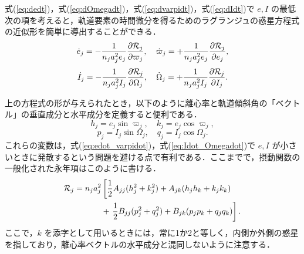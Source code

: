 \documentclass[11pt,a4paper,oneside,onecolumn]{jreport}
\begin{document}
式(\ref{eq:dedt})，式(\ref{eq:dOmegadt})，式(\ref{eq:dvarpidt})，式(\ref{eq:dIdt})で $e, I$ の最低次の項を考えると，軌道要素の時間微分を得るためのラグランジュの惑星方程式の近似形を簡単に導出することができる．
\begin{equation}
\dot{e}_j = - \frac{1}{n_j a_j^2 e_j} \frac{\partial {\cal R}_j}{\partial \varpi_j}, \quad \dot{\varpi}_j = + \frac{1}{n_j a_j^2 e_j} \frac{\partial {\cal R}_j}{\partial e_j}, \label{eq:edot_varpidot}
\end{equation}
\begin{equation}
\dot{I}_j = - \frac{1}{n_j a_j^2 I_j} \frac{\partial {\cal R}_j}{\partial \Omega_j}, \quad \dot{\Omega}_j = + \frac{1}{n_j a_j^2 I_j} \frac{\partial {\cal R}_j}{\partial I_j}. \label{eq:Idot_Omegadot}
\end{equation}

上の方程式の形が与えられたとき，以下のように離心率と軌道傾斜角の「ベクトル」の垂直成分と水平成分を定義すると便利である．
\begin{equation}
h_j = e_j \sin \varpi_j, \quad k_j = e_j \cos \varpi_j,
\end{equation}
\begin{equation}
p_j = I_j \sin \Omega_j, \quad q_j = I_j \cos \Omega_j.
\end{equation}
これらの変数は，式(\ref{eq:edot_varpidot})，式(\ref{eq:Idot_Omegadot})で $e, I$ が小さいときに発散するという問題を避ける点で有利である．ここまでで，摂動関数の一般化された永年項はこのように書ける．
\begin{equation}
\begin{split}
{\cal R}_j = n_j a_j^2 & \left[ \frac{1}{2} A_{jj} (h_j^2 + k_j^2) + A_{jk} (h_j h_k + k_j k_k) \right. \\
& + \left. \frac{1}{2} B_{jj} (p_j^2 + q_j^2) + B_{jk} (p_j p_k + q_j q_k) \right]. \\
\end{split} \label{eq:cal_R_hkpq}
\end{equation} 
ここで，$k$ を添字として用いるときには，常に1か2と等しく，内側か外側の惑星を指しており，離心率ベクトルの水平成分と混同しないように注意する．
\end{document}
